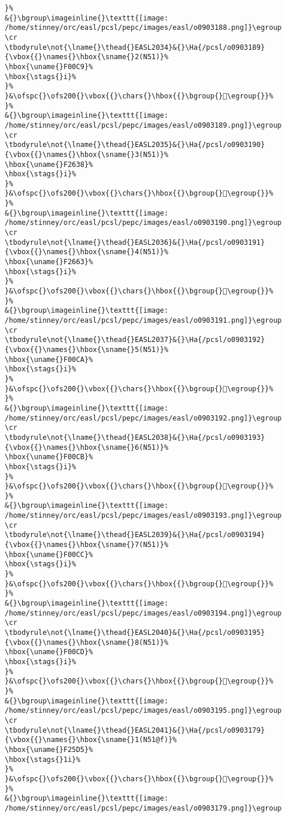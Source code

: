\begin{verbatim}
}%
&{}\bgroup\imageinline{}\texttt{[image: /home/stinney/orc/easl/pcsl/pepc/images/easl/o0903188.png]}\egroup
\cr
\tbodyrule\not{\lname{}\thead{}EASL2034}&{}\Ha{/pcsl/o0903189}{\vbox{{}\names{}\hbox{\sname{}2(N51)}%
\hbox{\uname{}F00C9}%
\hbox{\stags{}i}%
}%
}&\ofspc{}\ofs200{}\vbox{{}\chars{}\hbox{{}\bgroup{}󰃉\egroup{}}%
}%
&{}\bgroup\imageinline{}\texttt{[image: /home/stinney/orc/easl/pcsl/pepc/images/easl/o0903189.png]}\egroup
\cr
\tbodyrule\not{\lname{}\thead{}EASL2035}&{}\Ha{/pcsl/o0903190}{\vbox{{}\names{}\hbox{\sname{}3(N51)}%
\hbox{\uname{}F2638}%
\hbox{\stags{}i}%
}%
}&\ofspc{}\ofs200{}\vbox{{}\chars{}\hbox{{}\bgroup{}󲘸\egroup{}}%
}%
&{}\bgroup\imageinline{}\texttt{[image: /home/stinney/orc/easl/pcsl/pepc/images/easl/o0903190.png]}\egroup
\cr
\tbodyrule\not{\lname{}\thead{}EASL2036}&{}\Ha{/pcsl/o0903191}{\vbox{{}\names{}\hbox{\sname{}4(N51)}%
\hbox{\uname{}F2663}%
\hbox{\stags{}i}%
}%
}&\ofspc{}\ofs200{}\vbox{{}\chars{}\hbox{{}\bgroup{}󲙣\egroup{}}%
}%
&{}\bgroup\imageinline{}\texttt{[image: /home/stinney/orc/easl/pcsl/pepc/images/easl/o0903191.png]}\egroup
\cr
\tbodyrule\not{\lname{}\thead{}EASL2037}&{}\Ha{/pcsl/o0903192}{\vbox{{}\names{}\hbox{\sname{}5(N51)}%
\hbox{\uname{}F00CA}%
\hbox{\stags{}i}%
}%
}&\ofspc{}\ofs200{}\vbox{{}\chars{}\hbox{{}\bgroup{}󰃊\egroup{}}%
}%
&{}\bgroup\imageinline{}\texttt{[image: /home/stinney/orc/easl/pcsl/pepc/images/easl/o0903192.png]}\egroup
\cr
\tbodyrule\not{\lname{}\thead{}EASL2038}&{}\Ha{/pcsl/o0903193}{\vbox{{}\names{}\hbox{\sname{}6(N51)}%
\hbox{\uname{}F00CB}%
\hbox{\stags{}i}%
}%
}&\ofspc{}\ofs200{}\vbox{{}\chars{}\hbox{{}\bgroup{}󰃋\egroup{}}%
}%
&{}\bgroup\imageinline{}\texttt{[image: /home/stinney/orc/easl/pcsl/pepc/images/easl/o0903193.png]}\egroup
\cr
\tbodyrule\not{\lname{}\thead{}EASL2039}&{}\Ha{/pcsl/o0903194}{\vbox{{}\names{}\hbox{\sname{}7(N51)}%
\hbox{\uname{}F00CC}%
\hbox{\stags{}i}%
}%
}&\ofspc{}\ofs200{}\vbox{{}\chars{}\hbox{{}\bgroup{}󰃌\egroup{}}%
}%
&{}\bgroup\imageinline{}\texttt{[image: /home/stinney/orc/easl/pcsl/pepc/images/easl/o0903194.png]}\egroup
\cr
\tbodyrule\not{\lname{}\thead{}EASL2040}&{}\Ha{/pcsl/o0903195}{\vbox{{}\names{}\hbox{\sname{}8(N51)}%
\hbox{\uname{}F00CD}%
\hbox{\stags{}i}%
}%
}&\ofspc{}\ofs200{}\vbox{{}\chars{}\hbox{{}\bgroup{}󰃍\egroup{}}%
}%
&{}\bgroup\imageinline{}\texttt{[image: /home/stinney/orc/easl/pcsl/pepc/images/easl/o0903195.png]}\egroup
\cr
\tbodyrule\not{\lname{}\thead{}EASL2041}&{}\Ha{/pcsl/o0903179}{\vbox{{}\names{}\hbox{\sname{}1(N51@f)}%
\hbox{\uname{}F25D5}%
\hbox{\stags{}1i}%
}%
}&\ofspc{}\ofs200{}\vbox{{}\chars{}\hbox{{}\bgroup{}󲗕\egroup{}}%
}%
&{}\bgroup\imageinline{}\texttt{[image: /home/stinney/orc/easl/pcsl/pepc/images/easl/o0903179.png]}\egroup

\end{verbatim}
